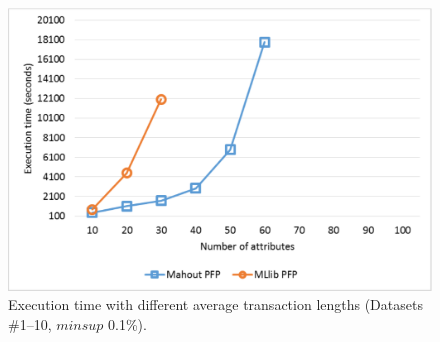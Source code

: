 \begin{figure}[!t]
\includegraphics[width=5in]{attributes_deeper.eps}
\caption{Execution time with different average transaction lengths %
(Datasets \#1--10, $minsup$ 0.1\%).}
\label{attributes_deeper}
\end{figure}

